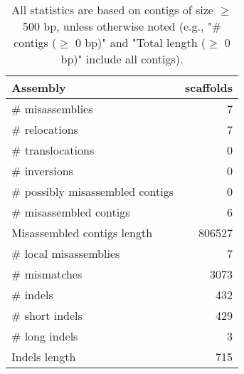 \documentclass[12pt,a4paper]{article}
\begin{document}
\begin{table}[ht]
\begin{center}
\caption{All statistics are based on contigs of size $\geq$ 500 bp, unless otherwise noted (e.g., "\# contigs ($\geq$ 0 bp)" and "Total length ($\geq$ 0 bp)" include all contigs).}
\begin{tabular}{|l*{1}{|r}|}
\hline
Assembly & scaffolds \\ \hline
\# misassemblies & 7 \\ \hline
\hspace{5mm}\# relocations & 7 \\ \hline
\hspace{5mm}\# translocations & 0 \\ \hline
\hspace{5mm}\# inversions & 0 \\ \hline
\# possibly misassembled contigs & 0 \\ \hline
\# misassembled contigs & 6 \\ \hline
Misassembled contigs length & 806527 \\ \hline
\# local misassemblies & 7 \\ \hline
\# mismatches & 3073 \\ \hline
\# indels & 432 \\ \hline
\hspace{5mm}\# short indels & 429 \\ \hline
\hspace{5mm}\# long indels & 3 \\ \hline
Indels length & 715 \\ \hline
\end{tabular}
\end{center}
\end{table}
\end{document}
